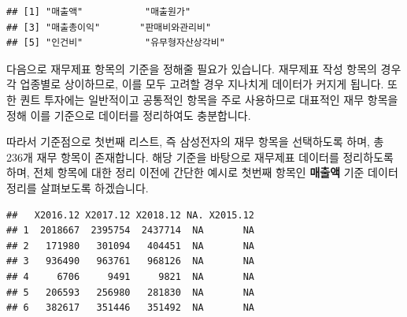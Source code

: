 \documentclass[12pt,]{book}
\newenvironment{Shaded}{\begin{snugshade}}{\end{snugshade}}
\newcommand{\CommentTok}[1]{\textcolor[rgb]{0.56,0.35,0.01}{\textit{#1}}}
\newcommand{\ControlFlowTok}[1]{\textcolor[rgb]{0.13,0.29,0.53}{\textbf{#1}}}
\newcommand{\KeywordTok}[1]{\textcolor[rgb]{0.13,0.29,0.53}{\textbf{#1}}}
\newcommand{\NormalTok}[1]{#1}
\newcommand{\OperatorTok}[1]{\textcolor[rgb]{0.81,0.36,0.00}{\textbf{#1}}}
\newcommand{\OtherTok}[1]{\textcolor[rgb]{0.56,0.35,0.01}{#1}}
\newcommand{\StringTok}[1]{\textcolor[rgb]{0.31,0.60,0.02}{#1}}
\begin{document}
\begin{verbatim}
## [1] "매출액"           "매출원가"        
## [3] "매출총이익"       "판매비와관리비"  
## [5] "인건비"           "유무형자산상각비"
\end{verbatim}

다음으로 재무제표 항목의 기준을 정해줄 필요가 있습니다. 재무제표 작성 항목의 경우 각 업종별로 상이하므로, 이를 모두 고려할 경우 지나치게 데이터가 커지게 됩니다. 또한 퀀트 투자에는 일반적이고 공통적인 항목을 주로 사용하므로 대표적인 재무 항목을 정해 이를 기준으로 데이터를 정리하여도 충분합니다.

따라서 기준점으로 첫번째 리스트, 즉 삼성전자의 재무 항목을 선택하도록 하며, 총 236개 재무 항목이 존재합니다. 해당 기준을 바탕으로 재무제표 데이터를 정리하도록 하며, 전체 항목에 대한 정리 이전에 간단한 예시로 첫번째 항목인 \textbf{매출액} 기준 데이터 정리를 살펴보도록 하겠습니다.

\begin{Shaded}
\end{Shaded}

\begin{verbatim}
##   X2016.12 X2017.12 X2018.12 NA. X2015.12
## 1  2018667  2395754  2437714  NA       NA
## 2   171980   301094   404451  NA       NA
## 3   936490   963761   968126  NA       NA
## 4     6706     9491     9821  NA       NA
## 5   206593   256980   281830  NA       NA
## 6   382617   351446   351492  NA       NA
\end{verbatim}
\end{document}
